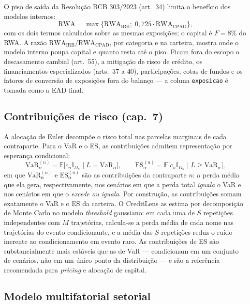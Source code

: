 \documentclass[11pt,a4paper]{article}
\newcommand{\VaR}{\mathrm{VaR}}
\newcommand{\ES}{\mathrm{ES}}
\newcommand{\E}{\mathbb{E}}
\newcommand{\Ind}{\mathbb{I}}
\begin{document}
O piso de saída da Resolução BCB 303/2023 (art.~34) limita o benefício dos modelos internos:
\begin{equation}
\mathrm{RWA}=\max\bigl\{\mathrm{RWA}_{\mathrm{IRB}};\;0{,}725\cdot\mathrm{RWA}_{\mathrm{CPAD}}\bigr\},
\label{eq:piso}
\end{equation}
com os dois termos calculados sobre as mesmas exposições; o capital é $F=8\%$ do RWA. A razão $\mathrm{RWA}_{\mathrm{IRB}}/\mathrm{RWA}_{\mathrm{CPAD}}$, por categoria e na carteira, mostra onde o modelo interno poupa capital e quanto resta até o piso. Ficam fora do escopo o descasamento cambial (art.~55), a mitigação de risco de crédito, os financiamentos especializados (arts.~37 a 40), participações, cotas de fundos e os fatores de conversão de exposições fora do balanço --- a coluna \texttt{exposicao} é tomada como a EAD final.

\subsection{Contribuições de risco (cap.~7)}

A alocação de Euler decompõe o risco total nas parcelas marginais de cada contraparte. Para o VaR e o ES, as contribuições admitem representação por esperança condicional:
\begin{equation}
\VaR_\alpha^{(n)} = \E\bigl[c_n \Ind_{D_n}\mid L=\VaR_\alpha\bigr],
\qquad
\ES_\alpha^{(n)} = \E\bigl[c_n \Ind_{D_n}\mid L\ge\VaR_\alpha\bigr],
\end{equation}
em que $\VaR_\alpha^{(n)}$ e $\ES_\alpha^{(n)}$ são as contribuições da contraparte $n$: a perda média que ela gera, respectivamente, nos cenários em que a perda total \emph{iguala} o VaR e nos cenários em que o \emph{excede ou iguala}. Por construção, as contribuições somam exatamente o VaR e o ES da carteira. O CreditLens as estima por decomposição de Monte Carlo no modelo \emph{threshold} gaussiano: em cada uma de $S$ repetições independentes com $M$ trajetórias, calcula-se a perda média de cada nome nas trajetórias do evento condicionante, e a média das $S$ repetições reduz o ruído inerente ao condicionamento em evento raro. As contribuições de ES são substancialmente mais estáveis que as de VaR --- condicionam em um conjunto de cenários, não em um único ponto da distribuição --- e são a referência recomendada para \emph{pricing} e alocação de capital.

\subsection{Modelo multifatorial setorial}
\label{sec:mf}
\end{document}
